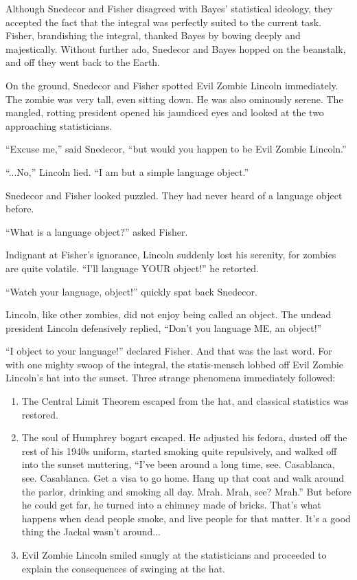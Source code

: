 \documentclass{article}
\begin{document}
Although Snedecor and Fisher disagreed with Bayes' statistical ideology, they accepted the fact that the integral was perfectly suited to the current task. Fisher, brandishing the integral, thanked Bayes by bowing deeply and majestically. Without further ado, Snedecor and Bayes hopped on the beanstalk, and off they went back to the Earth.  


On the ground, Snedecor and Fisher spotted Evil Zombie Lincoln immediately. The zombie was very tall, even sitting down. He was also ominously serene. The mangled, rotting president opened his jaundiced eyes and looked at the two approaching statisticians. 

``Excuse me,'' said Snedecor, ``but would you happen to be Evil Zombie Lincoln.'' 

``...No,'' Lincoln lied. ``I am but a simple language object.'' 

Snedecor and Fisher looked puzzled. They had never heard of a language object before. 

``What is a language object?'' asked Fisher. 

Indignant at Fisher's ignorance, Lincoln suddenly lost his serenity, for zombies are quite volatile. ``I'll language YOUR object!'' he retorted. 

``Watch your language, object!'' quickly spat back Snedecor. 

Lincoln, like other zombies, did not enjoy being called an object. The undead president Lincoln defensively replied, ``Don't you language ME, an object!'' 

``I object to your language!'' declared Fisher. And that was the last word. For with one mighty swoop of the integral, the statis-mensch lobbed off Evil Zombie Lincoln's hat into the sunset. Three strange phenomena immediately followed: 

\begin{enumerate}
\item The Central Limit Theorem escaped from the hat, and classical statistics was restored.
\item The soul of Humphrey bogart escaped. He adjusted his fedora, dusted off the rest of his 1940s uniform, started smoking quite repulsively, and walked off into the sunset muttering, ``I've been around a long time, see. Casablanca, see. Casablanca. Get a visa to go home. Hang up that coat and walk around the parlor, drinking and smoking all day. Mrah. Mrah, see? Mrah.'' But before he could get far, he turned into a chimney made of bricks. That's what happens when dead people smoke, and live people for that matter. It's a good thing the Jackal wasn't around...
\item Evil Zombie Lincoln smiled smugly at the statisticians and proceeded to explain the consequences of swinging at the hat.
\end{enumerate}
\end{document}
